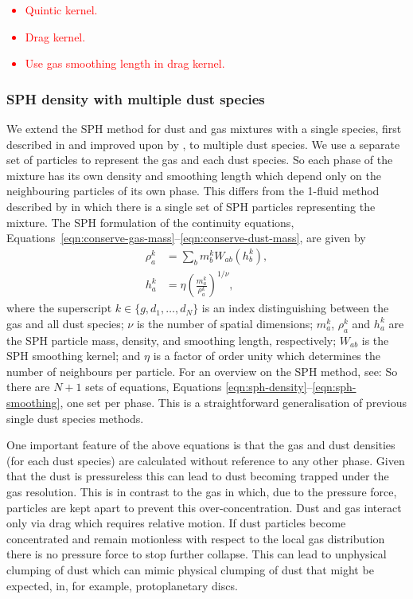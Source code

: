 \documentclass[fleqn,usenatbib]{mnras}
\begin{document}
\textcolor{red}{
\begin{itemize}
   \item Quintic kernel.
   \item Drag kernel.
   \item Use gas smoothing length in drag kernel.
\end{itemize}
}

\subsubsection{SPH density with multiple dust species}

We extend the SPH method for dust and gas mixtures with a single species, first
described in \citet{Monaghan1995CoPhC..87..225M} and improved upon by
\citet{Laibe2012MNRAS.420.2345L,Laibe2012MNRAS.420.2365L}, to multiple dust
species. We use a separate set of particles to represent the gas and each dust
species. So each phase of the mixture has its own density and smoothing length
which depend only on the neighbouring particles of its own phase. This differs
from the 1-fluid method described by \citet{Hutchison2018MNRAS.476.2186H} in
which there is a single set of SPH particles representing the mixture. The SPH
formulation of the continuity equations,
Equations~\ref{eqn:conserve-gas-mass}--\ref{eqn:conserve-dust-mass}, are given
by
%
\begin{align}
   \label{eqn:sph-density}
   \rho^k_a &= \sum_b m^k_b W_{ab}(h^k_b), \\
   h^k_a &= \eta \left(\frac{m^k_a}{\rho^k_a}\right)^{1/\nu},
   \label{eqn:sph-smoothing}
\end{align}
%
where the superscript \(k \in \{g, d_1, \dots, d_N\}\) is an index
distinguishing between the gas and all dust species; \(\nu\) is the number of
spatial dimensions; \(m^k_a\), \(\rho^k_a\) and \(h^k_a\) are the SPH particle
mass, density, and smoothing length, respectively; \(W_{ab}\) is the SPH
smoothing kernel; and \(\eta\) is a factor of order unity which determines the
number of neighbours per particle. For an overview on the SPH method, see:
\citet{Monaghan1992ARA&A..30..543M,Price2012JCoPh.231..759P}  So there are \(N +
1\) sets of equations, Equations \ref{eqn:sph-density}--\ref{eqn:sph-smoothing},
one set per phase. This is a straightforward generalisation of previous single
dust species methods.

One important feature of the above equations is that the gas and dust densities
(for each dust species) are calculated without reference to any other phase.
Given that the dust is pressureless this can lead to dust becoming trapped under
the gas resolution. This is in contrast to the gas in which, due to the pressure
force, particles are kept apart to prevent this over-concentration. Dust and gas
interact only via drag which requires relative motion. If dust particles become
concentrated and remain motionless with respect to the local gas distribution
there is no pressure force to stop further collapse. This can lead to unphysical
clumping of dust which can mimic physical clumping of dust that might be
expected, in, for example, protoplanetary discs.
\end{document}
